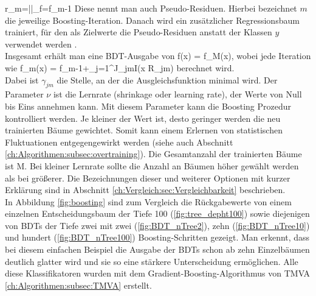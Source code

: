 \beq
r_m=\left|\right|_{f=f_{m-1}}
\label{eq:pseudo_residual}
\eeq
Diese nennt man auch Pseudo-Residuen. Hierbei bezeichnet $m$ die jeweilige Boosting-Iteration. Danach wird ein zus\"atzlicher Regressionsbaum trainiert, f\"ur den als Zielwerte die Pseudo-Residuen anstatt der Klassen $y$ verwendet werden \cite{Hocker:2007ht}.\\
Insgesamt erh\"alt man eine BDT-Ausgabe von
\beq
\hat f(x) = f_M(x),
\eeq
wobei jede Iteration wie
\beq
f_m(x) = f_{m-1}+\nu\cdot\sum_{j=1}^J\gamma_{jm}I(x \in R_{jm})
\eeq
berechnet wird.\\
Dabei ist $\gamma_{jm}$ die Stelle, an der die Ausgleichsfunktion minimal wird.
Der Parameter $\nu$ ist die Lernrate (shrinkage oder learning rate), der Werte von Null bis Eins annehmen kann. Mit diesem Parameter kann die Boosting Prozedur kontrolliert werden. Je kleiner der Wert ist, desto geringer werden die neu trainierten B\"aume gewichtet. Somit kann einem Erlernen von statistischen Fluktuationen entgegengewirkt werden (siehe auch Abschnitt \ref{ch:Algorithmen:subsec:overtraining}). Die Gesamtanzahl der trainierten B\"aume ist M. Bei kleiner Lernrate sollte die Anzahl an B\"aumen h\"oher gew\"ahlt werden als bei gr\"o\ss erer. Die Bezeichnungen dieser und weiterer Optionen mit kurzer Erkl\"arung sind in Abschnitt \ref{ch:Vergleich:sec:Vergleichbarkeit} beschrieben.\\
In Abbildung \ref{fig:boosting} sind zum Vergleich die R\"uckgabewerte von einem einzelnen Entscheidungsbaum der Tiefe 100 (\ref{fig:tree_depht100}) sowie diejenigen von BDTs der Tiefe zwei mit zwei (\ref{fig:BDT_nTree2}), zehn (\ref{fig:BDT_nTree10}) und hundert (\ref{fig:BDT_nTree100}) Boosting-Schritten gezeigt. Man erkennt, dass bei diesem einfachen Beispiel die Ausgabe der BDTs schon ab zehn Einzelb\"aumen deutlich glatter wird und sie so eine st\"arkere Unterscheidung erm\"oglichen. Alle diese Klassifikatoren wurden mit dem Gradient-Boosting-Algorithmus von TMVA \ref{ch:Algorithmen:subsec:TMVA} erstellt.

